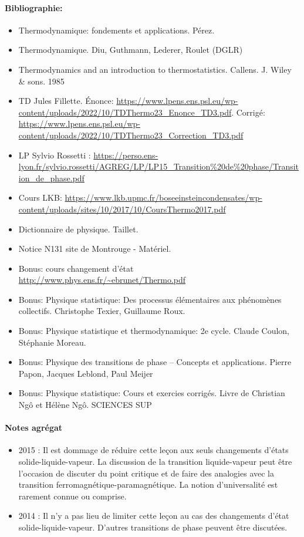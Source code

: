 \documentclass[11pt]{report}
\numberwithin{figure}{section}
\numberwithin{equation}{section}
\numberwithin{table}{section}
\newcommand{\1}{\boldsymbol{1}}
\begin{document}
\paragraph*{Bibliographie:}
\begin{itemize}
\item Thermodynamique: fondements et applications. Pérez.
\item Thermodynamique. Diu, Guthmann, Lederer, Roulet (DGLR)
\item Thermodynamics and an introduction to thermostatistics. Callens. J. Wiley \& sons. 1985
\item TD Jules Fillette. Énonce: \url{https://www.lpens.ens.psl.eu/wp-content/uploads/2022/10/TDThermo23_Enonce_TD3.pdf}. Corrigé: \url{https://www.lpens.ens.psl.eu/wp-content/uploads/2022/10/TDThermo23_Correction_TD3.pdf}
\item LP Sylvio Rossetti : \url{https://perso.ens-lyon.fr/sylvio.rossetti/AGREG/LP/LP15_Transition%20de%20phase/Transition_de_phase.pdf}
\item Cours LKB: \url{https://www.lkb.upmc.fr/boseeinsteincondensates/wp-content/uploads/sites/10/2017/10/CoursThermo2017.pdf}
\item Dictionnaire de physique. Taillet.
\item Notice N131 site de Montrouge - Matériel.
\item Bonus: cours changement d'état \url{http://www.phys.ens.fr/~ebrunet/Thermo.pdf}
\item Bonus: Physique statistique: Des processus élémentaires aux phénomènes collectifs. Christophe Texier, Guillaume Roux.
\item Bonus: Physique statistique et thermodynamique: 2e cycle. Claude Coulon, Stéphanie Moreau.
\item Bonus: Physique des transitions de phase -- Concepts et applications. Pierre Papon, Jacques Leblond, Paul Meijer
\item Bonus: Physique statistique: Cours et exercies corrigés. Livre de Christian Ngô et Hélène Ngô. SCIENCES SUP
\end{itemize}

\paragraph{Notes agrégat}
\begin{itemize}
\item 2015 : Il est dommage de réduire cette leçon aux seuls changements d’états solide-liquide-vapeur. La discussion
de la transition liquide-vapeur peut être l’occasion de discuter du point critique et de faire des analogies avec la
transition ferromagnétique-paramagnétique. La notion d’universalité est rarement connue ou comprise.
\item 2014 : Il n’y a pas lieu de limiter cette leçon au cas des changements d’état solide-liquide-vapeur. D’autres
transitions de phase peuvent être discutées.
\end{itemize}
\end{document}
